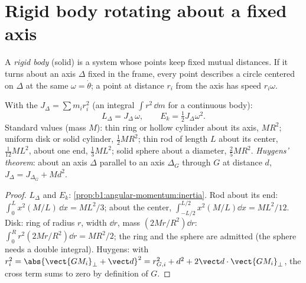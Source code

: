 \section{Rigid body rotating about a fixed axis}

\begin{definition}\label{def:b1:systems-of-points:solid}
A \emph{rigid body} (solid) is a system whose points keep fixed mutual
distances. If it turns about an axis $\Delta$ fixed in the frame, every
point describes a circle centered on $\Delta$ at the same 
$\omega = \dot\theta$; a point at distance $r_i$ from the axis has speed
$r_i\omega$.
\end{definition}

\begin{proposition}\label{prop:b1:systems-of-points:inertia}
With the \emph{} $J_\Delta = \sum m_ir_i^2$ (an integral
$\int r^2\,\dd m$ for a continuous body):
\[
L_\Delta = J_\Delta\,\omega, \qquad E_k = \tfrac12 J_\Delta\omega^2 .
\]
Standard values (mass $M$): thin ring or hollow cylinder about its axis,
$MR^2$; uniform disk or solid cylinder, $\tfrac12 MR^2$; thin rod of
length $L$ about its center, $\tfrac{1}{12}ML^2$, about one end,
$\tfrac13 ML^2$; solid sphere about a diameter, $\tfrac25 MR^2$.
\emph{Huygens' theorem}: about an axis $\Delta$ parallel to an axis
$\Delta_G$ through $G$ at distance $d$, $J_\Delta = J_{\Delta_G} + Md^2$.
\end{proposition}

\begin{proof}
$L_\Delta$ and $E_k$: \cref{prop:b1:angular-momentum:inertia}. Rod about
its end: $\int_0^L x^2(M/L)\,\dd x = ML^2/3$; about the center, $\int_{-L/2}^{L/2}
x^2(M/L)\dd x = ML^2/12$. Disk: ring of radius $r$, width $\dd r$, mass
$(2Mr/R^2)\dd r$: $\int_0^R r^2(2Mr/R^2)\dd r = MR^2/2$; the ring and the
sphere are admitted (the sphere needs a double integral). Huygens: with
$r_i^2 = \abs{\vect{GM_i}_\perp + \vect d}^2 = r_{G,i}^2 + d^2 + 2\vect d\cdot
\vect{GM_i}_\perp$, the cross term sums to zero by definition of $G$.
\end{proof}

